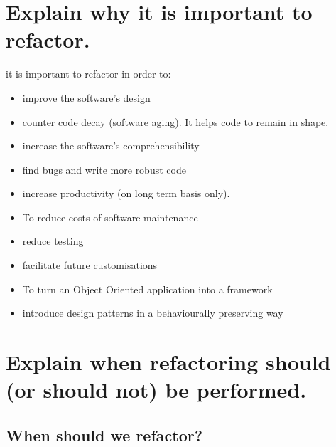 \section{Explain why it is important to refactor.}
it is important to refactor in order to:

\begin{itemize}
\item improve the software's design
\item counter code decay (software aging). It helps code to remain in shape.
\item increase the software's comprehensibility
\item find bugs and write more robust code
\item increase productivity (on long term basis only).
\item To reduce costs of software maintenance
\item reduce testing
\item facilitate future customisations
\item To turn an Object Oriented application into a framework
\item introduce design patterns in a behaviourally preserving way
\end{itemize}

\section{Explain when refactoring should (or should not) be performed.}

\subsection{When should we refactor?}

